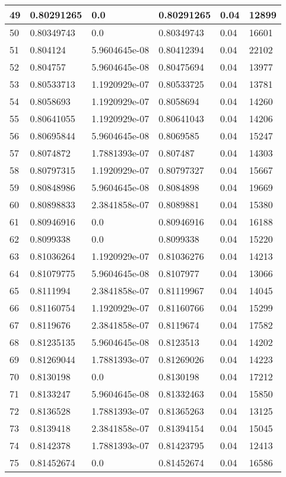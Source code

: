 \begin{longtable}{|l|l|l|l|l|l|}
49 & 0.80291265 & 0.0 & 0.80291265 & 0.04 & 12899 \\ \hline 
50 & 0.80349743 & 0.0 & 0.80349743 & 0.04 & 16601 \\ \hline 
51 & 0.804124 & 5.9604645e-08 & 0.80412394 & 0.04 & 22102 \\ \hline 
52 & 0.804757 & 5.9604645e-08 & 0.80475694 & 0.04 & 13977 \\ \hline 
53 & 0.80533713 & 1.1920929e-07 & 0.80533725 & 0.04 & 13781 \\ \hline 
54 & 0.8058693 & 1.1920929e-07 & 0.8058694 & 0.04 & 14260 \\ \hline 
55 & 0.80641055 & 1.1920929e-07 & 0.80641043 & 0.04 & 14206 \\ \hline 
56 & 0.80695844 & 5.9604645e-08 & 0.8069585 & 0.04 & 15247 \\ \hline 
57 & 0.8074872 & 1.7881393e-07 & 0.807487 & 0.04 & 14303 \\ \hline 
58 & 0.80797315 & 1.1920929e-07 & 0.80797327 & 0.04 & 15667 \\ \hline 
59 & 0.80848986 & 5.9604645e-08 & 0.8084898 & 0.04 & 19669 \\ \hline 
60 & 0.80898833 & 2.3841858e-07 & 0.8089881 & 0.04 & 15380 \\ \hline 
61 & 0.80946916 & 0.0 & 0.80946916 & 0.04 & 16188 \\ \hline 
62 & 0.8099338 & 0.0 & 0.8099338 & 0.04 & 15220 \\ \hline 
63 & 0.81036264 & 1.1920929e-07 & 0.81036276 & 0.04 & 14213 \\ \hline 
64 & 0.81079775 & 5.9604645e-08 & 0.8107977 & 0.04 & 13066 \\ \hline 
65 & 0.8111994 & 2.3841858e-07 & 0.81119967 & 0.04 & 14045 \\ \hline 
66 & 0.81160754 & 1.1920929e-07 & 0.81160766 & 0.04 & 15299 \\ \hline 
67 & 0.8119676 & 2.3841858e-07 & 0.8119674 & 0.04 & 17582 \\ \hline 
68 & 0.81235135 & 5.9604645e-08 & 0.8123513 & 0.04 & 14202 \\ \hline 
69 & 0.81269044 & 1.7881393e-07 & 0.81269026 & 0.04 & 14223 \\ \hline 
70 & 0.8130198 & 0.0 & 0.8130198 & 0.04 & 17212 \\ \hline 
71 & 0.8133247 & 5.9604645e-08 & 0.81332463 & 0.04 & 15850 \\ \hline 
72 & 0.8136528 & 1.7881393e-07 & 0.81365263 & 0.04 & 13125 \\ \hline 
73 & 0.8139418 & 2.3841858e-07 & 0.81394154 & 0.04 & 15045 \\ \hline 
74 & 0.8142378 & 1.7881393e-07 & 0.81423795 & 0.04 & 12413 \\ \hline 
75 & 0.81452674 & 0.0 & 0.81452674 & 0.04 & 16586 \\ \hline 
\end{longtable}